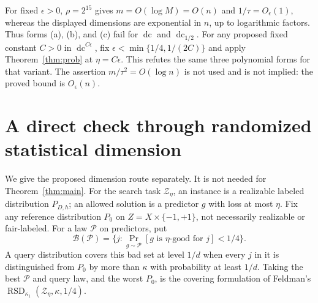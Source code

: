 \documentclass[11pt]{article}
\DeclareMathOperator{\dc}{dc}
\DeclareMathOperator{\RSD}{RSD}
\newcommand{\1}{\mathbf 1}
\begin{document}
For fixed $\epsilon>0$, $\rho=2^{15}$ gives $m=O(\log M)=O(n)$ and $1/\tau=O_\epsilon(1)$, whereas the displayed dimensions are exponential in $n$, up to logarithmic factors. Thus forms (a), (b), and (c) fail for $\dc$ and $\dc_{1/2}$. For any proposed fixed constant $C>0$ in $\dc^{C\epsilon}$, fix $\epsilon<\min\{1/4,1/(2C)\}$ and apply Theorem~\ref{thm:prob} at $\eta=C\epsilon$. This refutes the same three polynomial forms for that variant. The assertion $m/\tau^2=O(\log n)$ is not used and is not implied: the proved bound is $O_\epsilon(n)$.

\section{A direct check through randomized statistical dimension}
We give the proposed dimension route separately. It is not needed for Theorem~\ref{thm:main}.
For the search task $\mathcal Z_\eta$, an instance is a realizable labeled distribution $P_{D,h}$; an allowed solution is a predictor $g$ with loss at most $\eta$. Fix any reference distribution $P_0$ on $Z=X\times\{-1,+1\}$, not necessarily realizable or fair-labeled. For a law $\mathcal P$ on predictors, put
\[
 \mathcal B(\mathcal P)=\{j:\Pr_{g\sim\mathcal P}[g\text{ is }\eta\text{-good for }j]<1/4\}.
\]
A query distribution covers this bad set at level $1/d$ when every $j$ in it is distinguished from $P_0$ by more than $\kappa$ with probability at least $1/d$. Taking the best $\mathcal P$ and query law, and the worst $P_0$, is the covering formulation of Feldman's $\RSD_{\kappa_1}(\mathcal Z_\eta,\kappa,1/4)$.
\end{document}
